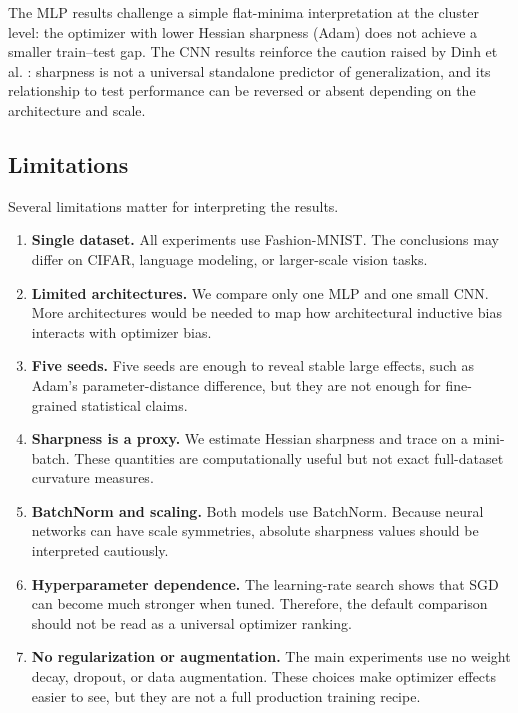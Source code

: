 \documentclass[11pt]{article}
\begin{document}
The MLP results challenge a simple flat-minima interpretation \cite{hochreiter1997flat,keskar2017large} at the cluster level: the optimizer with lower Hessian sharpness (Adam) does not achieve a smaller train--test gap. The CNN results reinforce the caution raised by Dinh et al. \cite{dinh2017sharp}: sharpness is not a universal standalone predictor of generalization, and its relationship to test performance can be reversed or absent depending on the architecture and scale.

\subsection{Limitations}

Several limitations matter for interpreting the results.

\begin{enumerate}
    \item \textbf{Single dataset.} All experiments use Fashion-MNIST. The conclusions may differ on CIFAR, language modeling, or larger-scale vision tasks.
    \item \textbf{Limited architectures.} We compare only one MLP and one small CNN. More architectures would be needed to map how architectural inductive bias interacts with optimizer bias.
    \item \textbf{Five seeds.} Five seeds are enough to reveal stable large effects, such as Adam's parameter-distance difference, but they are not enough for fine-grained statistical claims.
    \item \textbf{Sharpness is a proxy.} We estimate Hessian sharpness and trace on a mini-batch. These quantities are computationally useful but not exact full-dataset curvature measures.
    \item \textbf{BatchNorm and scaling.} Both models use BatchNorm. Because neural networks can have scale symmetries, absolute sharpness values should be interpreted cautiously.
    \item \textbf{Hyperparameter dependence.} The learning-rate search shows that SGD can become much stronger when tuned. Therefore, the default comparison should not be read as a universal optimizer ranking.
    \item \textbf{No regularization or augmentation.} The main experiments use no weight decay, dropout, or data augmentation. These choices make optimizer effects easier to see, but they are not a full production training recipe.
\end{enumerate}
\end{document}
